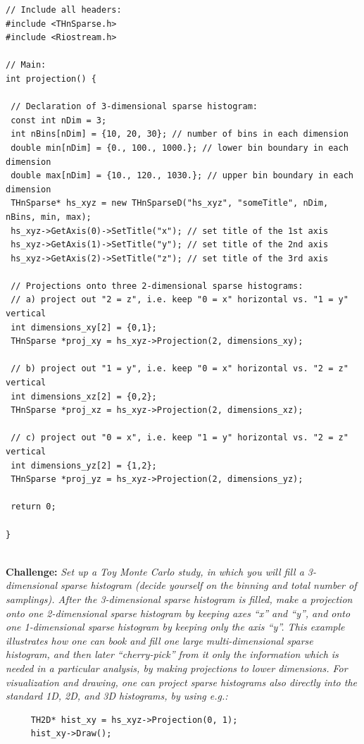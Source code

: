 \documentclass[11pt]{article}
\begin{document}
{ \small

\begin{verbatim}
// Include all headers:
#include <THnSparse.h>
#include <Riostream.h>
	
// Main:
int projection() {
		
 // Declaration of 3-dimensional sparse histogram:
 const int nDim = 3;
 int nBins[nDim] = {10, 20, 30}; // number of bins in each dimension
 double min[nDim] = {0., 100., 1000.}; // lower bin boundary in each dimension
 double max[nDim] = {10., 120., 1030.}; // upper bin boundary in each dimension
 THnSparse* hs_xyz = new THnSparseD("hs_xyz", "someTitle", nDim, nBins, min, max);
 hs_xyz->GetAxis(0)->SetTitle("x"); // set title of the 1st axis 	
 hs_xyz->GetAxis(1)->SetTitle("y"); // set title of the 2nd axis 	
 hs_xyz->GetAxis(2)->SetTitle("z"); // set title of the 3rd axis 	
		
 // Projections onto three 2-dimensional sparse histograms:
 // a) project out "2 = z", i.e. keep "0 = x" horizontal vs. "1 = y" vertical
 int dimensions_xy[2] = {0,1}; 
 THnSparse *proj_xy = hs_xyz->Projection(2, dimensions_xy);

 // b) project out "1 = y", i.e. keep "0 = x" horizontal vs. "2 = z" vertical
 int dimensions_xz[2] = {0,2}; 
 THnSparse *proj_xz = hs_xyz->Projection(2, dimensions_xz);

 // c) project out "0 = x", i.e. keep "1 = y" horizontal vs. "2 = z" vertical
 int dimensions_yz[2] = {1,2};
 THnSparse *proj_yz = hs_xyz->Projection(2, dimensions_yz);
		
 return 0;
		
}
	
\end{verbatim}

} %

\noindent\textbf{Challenge:} {\it Set up a Toy Monte Carlo study, in which you will fill a 3-dimensional sparse histogram (decide yourself on the binning and total number of samplings). After the 3-dimensional sparse histogram is filled, make a projection onto one 2-dimensional sparse histogram by keeping axes ``x'' and ``y'', and onto one 1-dimensional sparse histogram by keeping only the axis ``y''. This example illustrates how one can book and fill one large multi-dimensional sparse histogram, and then later ``cherry-pick'' from it only the information which is needed in a particular analysis, by making projections to lower dimensions. For visualization and drawing, one can project sparse histograms also directly into the standard 1D, 2D, and 3D histograms, by using e.g.:}
{ \small
\begin{verbatim}
	 TH2D* hist_xy = hs_xyz->Projection(0, 1); 
	 hist_xy->Draw();
\end{verbatim}
}	
\end{document}

